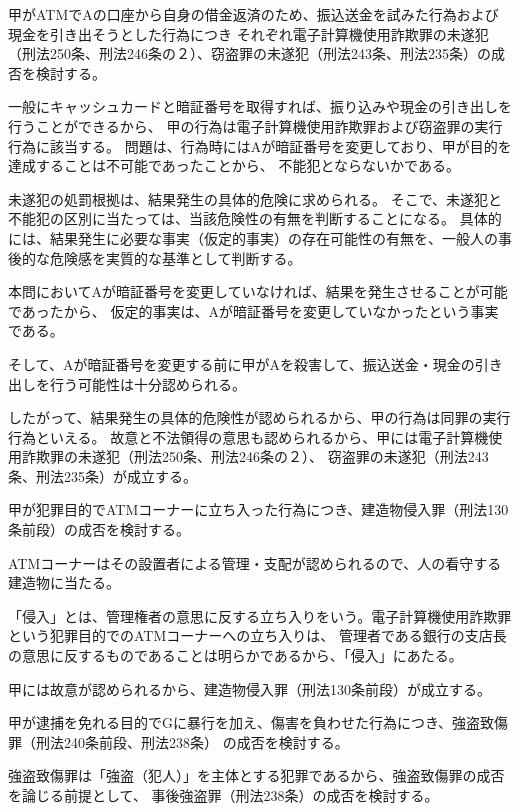 \documentclass[11pt]{jsarticle}
\begin{document}
	甲がATMでAの口座から自身の借金返済のため、振込送金を試みた行為および現金を引き出そうとした行為につき
	それぞれ電子計算機使用詐欺罪の未遂犯（刑法250条、刑法246条の２）、窃盗罪の未遂犯（刑法243条、刑法235条）の成否を検討する。
	
	\sectionB{}
		一般にキャッシュカードと暗証番号を取得すれば、振り込みや現金の引き出しを行うことができるから、
		甲の行為は電子計算機使用詐欺罪および窃盗罪の実行行為に該当する。
		問題は、行為時にはAが暗証番号を変更しており、甲が目的を達成することは不可能であったことから、
		不能犯とならないかである。
		
	\sectionB{}
		未遂犯の処罰根拠は、結果発生の具体的危険に求められる。
		そこで、未遂犯と不能犯の区別に当たっては、当該危険性の有無を判断することになる。
		具体的には、結果発生に必要な事実（仮定的事実）の存在可能性の有無を、一般人の事後的な危険感を実質的な基準として判断する。
		
		本問においてAが暗証番号を変更していなければ、結果を発生させることが可能であったから、
		仮定的事実は、Aが暗証番号を変更していなかったという事実である。
		
		そして、Aが暗証番号を変更する前に甲がAを殺害して、振込送金・現金の引き出しを行う可能性は十分認められる。
		
	\sectionB{}
		したがって、結果発生の具体的危険性が認められるから、甲の行為は同罪の実行行為といえる。
		故意と不法領得の意思も認められるから、甲には電子計算機使用詐欺罪の未遂犯（刑法250条、刑法246条の２）、
		窃盗罪の未遂犯（刑法243条、刑法235条）が成立する。
		
	甲が犯罪目的でATMコーナーに立ち入った行為につき、建造物侵入罪（刑法130条前段）の成否を検討する。
	
	ATMコーナーはその設置者による管理・支配が認められるので、人の看守する建造物に当たる。
	
	「侵入」とは、管理権者の意思に反する立ち入りをいう。電子計算機使用詐欺罪という犯罪目的でのATMコーナーへの立ち入りは、
	管理者である銀行の支店長の意思に反するものであることは明らかであるから、「侵入」にあたる。
	
	甲には故意が認められるから、建造物侵入罪（刑法130条前段）が成立する。
	
	甲が逮捕を免れる目的でGに暴行を加え、傷害を負わせた行為につき、強盗致傷罪（刑法240条前段、刑法238条）	の成否を検討する。
	
	\sectionB{}
		強盗致傷罪は「強盗（犯人）」を主体とする犯罪であるから、強盗致傷罪の成否を論じる前提として、
		事後強盗罪（刑法238条）の成否を検討する。
		
\end{document}
